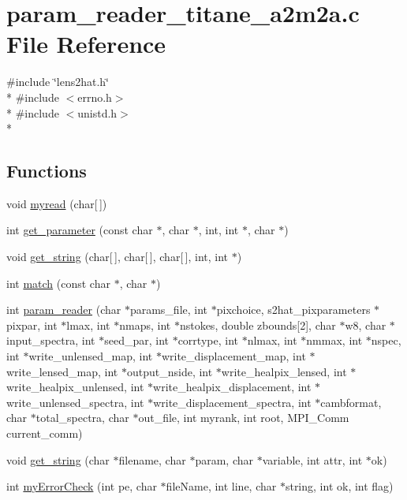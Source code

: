 \section{param\-\_\-reader\-\_\-titane\-\_\-a2m2a.\-c File Reference}
\label{param__reader__titane__a2m2a_8c}
{\ttfamily \#include \char`\"{}lens2hat.\-h\char`\"{}}\\*
{\ttfamily \#include $<$errno.\-h$>$}\\*
{\ttfamily \#include $<$unistd.\-h$>$}\\*
\subsection*{Functions}
\begin{DoxyCompactItemize}
\item 
void \hyperlink{param__reader__titane__a2m2a_8c_a50c0568f618886d78986c4a9d6a23ba4}{myread} (char\mbox{[}$\,$\mbox{]})
\item 
int \hyperlink{param__reader__titane__a2m2a_8c_aa58f4ecc3318546d08e4282c739db7a3}{get\-\_\-parameter} (const char $\ast$, char $\ast$, int, int $\ast$, char $\ast$)
\item 
void \hyperlink{param__reader__titane__a2m2a_8c_acdf8e6c6f50db79679922d3dbf74dd84}{get\-\_\-string} (char\mbox{[}$\,$\mbox{]}, char\mbox{[}$\,$\mbox{]}, char\mbox{[}$\,$\mbox{]}, int, int $\ast$)
\item 
int \hyperlink{param__reader__titane__a2m2a_8c_af71971b64e93dd85136d531400035e57}{match} (const char $\ast$, char $\ast$)
\item 
int \hyperlink{param__reader__titane__a2m2a_8c_a990ccd7e0b3352322502e77838c159d7}{param\-\_\-reader} (char $\ast$params\-\_\-file, int $\ast$pixchoice, s2hat\-\_\-pixparameters $\ast$pixpar, int $\ast$lmax, int $\ast$nmaps, int $\ast$nstokes, double zbounds\mbox{[}2\mbox{]}, char $\ast$w8, char $\ast$input\-\_\-spectra, int $\ast$seed\-\_\-par, int $\ast$corrtype, int $\ast$nlmax, int $\ast$nmmax, int $\ast$nspec, int $\ast$write\-\_\-unlensed\-\_\-map, int $\ast$write\-\_\-displacement\-\_\-map, int $\ast$write\-\_\-lensed\-\_\-map, int $\ast$output\-\_\-nside, int $\ast$write\-\_\-healpix\-\_\-lensed, int $\ast$write\-\_\-healpix\-\_\-unlensed, int $\ast$write\-\_\-healpix\-\_\-displacement, int $\ast$write\-\_\-unlensed\-\_\-spectra, int $\ast$write\-\_\-displacement\-\_\-spectra, int $\ast$cambformat, char $\ast$total\-\_\-spectra, char $\ast$out\-\_\-file, int myrank, int root, M\-P\-I\-\_\-\-Comm current\-\_\-comm)
\item 
void \hyperlink{param__reader__titane__a2m2a_8c_a1be51b19c79f5c49c6ce2128259fc093}{get\-\_\-string} (char $\ast$filename, char $\ast$param, char $\ast$variable, int attr, int $\ast$ok)
\item 
int \hyperlink{param__reader__titane__a2m2a_8c_a70bcbd531a6e4abc62d73f5b4532c2cc}{my\-Error\-Check} (int pe, char $\ast$file\-Name, int line, char $\ast$string, int ok, int flag)
\end{DoxyCompactItemize}


